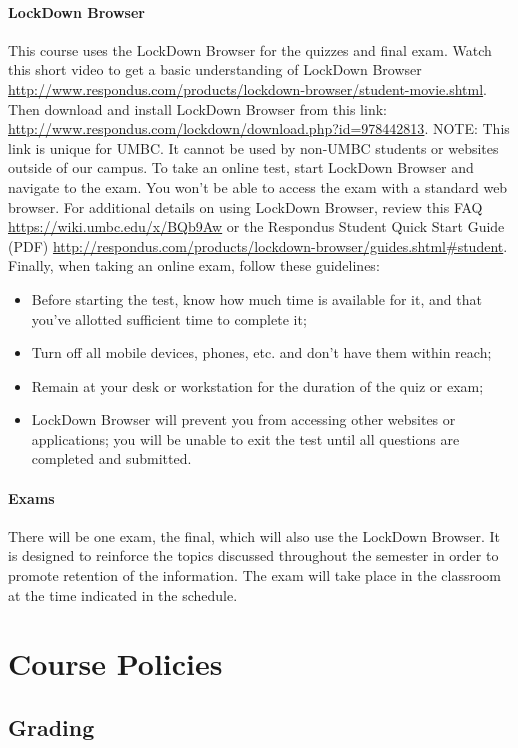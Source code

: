 \documentclass[letter,10pt]{article}
\begin{document}
\paragraph{LockDown Browser}This course uses the LockDown Browser for the quizzes and final exam. Watch this short video to get a basic understanding of LockDown Browser \url{http://www.respondus.com/products/lockdown-browser/student-movie.shtml}. Then download and install LockDown Browser from this link: \url{http://www.respondus.com/lockdown/download.php?id=978442813}. NOTE: This link is unique for UMBC. It cannot be used by non-UMBC students or websites outside of our campus. To take an online test, start LockDown Browser and navigate to the exam. You won't be able to access the exam with a standard web browser. For additional details on using LockDown Browser, review this FAQ \url{https://wiki.umbc.edu/x/BQb9Aw} or the Respondus Student Quick Start Guide (PDF) \url{http://respondus.com/products/lockdown-browser/guides.shtml#student}. Finally, when taking an online exam, follow these guidelines:
\begin{itemize}
\item Before starting the test, know how much time is available for it, and that you've allotted sufficient time to complete it;
\item Turn off all mobile devices, phones, etc. and don't have them within reach;
\item Remain at your desk or workstation for the duration of the quiz or exam;
\item LockDown Browser will prevent you from accessing other websites or applications; you will be unable to exit the test until all questions are completed and submitted.
\end{itemize}

\paragraph{Exams}There will be one exam, the final, which will also use the LockDown Browser. It is designed to reinforce the topics discussed throughout the semester in order to promote retention of the information. The exam will take place in the classroom at the time indicated in the schedule.

\section*{Course Policies}
\subsection*{Grading}
\end{document}
